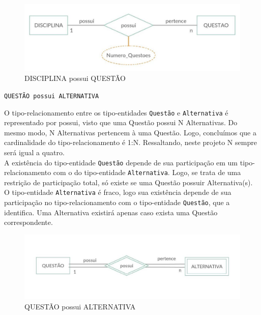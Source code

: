 \documentclass[12pt,a4paper]{article}
\begin{document}
\begin{center}
\begin{figure}[h]
    \centering
    \includegraphics[width=\linewidth]{disciplinaQuestao.jpg}
    \caption{DISCIPLINA possui QUESTÃO}
    \label{fig:disciplinaQuestao}
\end{figure}
\end{center}

\begin{center}
    \texttt{QUESTÃO \texttt{possui} ALTERNATIVA}
\end{center}

O tipo-relacionamento entre os tipo-entidades \texttt{Questão} e \texttt{Alternativa} é representado por possui, visto que uma Questão possui N Alternativas. Do mesmo modo, N Alternativas pertencem à uma Questão. Logo, concluímos que a cardinalidade do tipo-relacionamento é 1:N. Ressaltando, neste projeto N sempre será igual a quatro.\\

A existência do tipo-entidade \texttt{Questão} depende de sua participação em um tipo-relacionamento com o do tipo-entidade  {\texttt{Alternativa}}. Logo, se trata de uma restrição de participação total, só existe se uma Questão possuir Alternativa(s).\\

O tipo-entidade \texttt{Alternativa} é fraco, logo sua existência depende de sua participação no tipo-relacionamento com o tipo-entidade \texttt{Questão}, que a identifica. Uma Alternativa existirá apenas caso exista uma Questão correspondente.\\

\begin{center}
\begin{figure}[h]
    \centering
    \includegraphics[width=\linewidth]{questaoAlternativa.jpg}
    \caption{QUESTÃO possui ALTERNATIVA}
    \label{fig:questaoAlternativa}
\end{figure}
\end{center}
\end{document}
